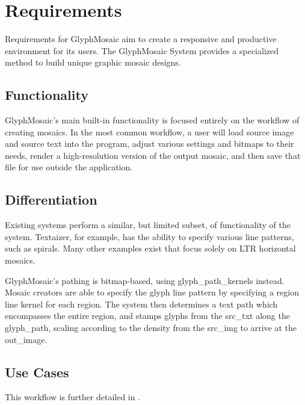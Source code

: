 \section{Requirements}
Requirements for GlyphMosaic aim to create a responsive and productive environment for its users.
The GlyphMosaic System provides a specialized method to build unique graphic mosaic designs.


\subsection{Functionality}
GlyphMosaic’s main built-in functionality is focused entirely on the workflow of creating mosaics.
In the most common workflow, a user will load source image and source text into the program, adjust various settings and bitmaps to their needs, render a high-resolution version of the output mosaic, and then save that file for use outside the application.


\subsection{Differentiation}
Existing systems perform a similar, but limited subset, of functionality of the system.
Textaizer\cite{textaizer}, for example, has the ability to specify various line patterns, such as spirals.
Many other examples exist that focus solely on LTR horizontal mosaics.

GlyphMosaic's pathing is \gls{bitmap}-based, using \glspl{glyph_path_kernel} instead.
Mosaic creators are able to specify the glyph line pattern by specifying a region line kernel for each region.
The system then determines a text path which encompasses the entire region, and stamps glyphs from the \gls{src_txt} along the \gls{glyph_path}, scaling according to the \gls{density} from the \gls{src_img} to arrive at the \gls{out_image}.

\subsection{Use Cases}
\label{sec:use_cases}

\begin{itemize}
\end{itemize}

This workflow is further detailed in .